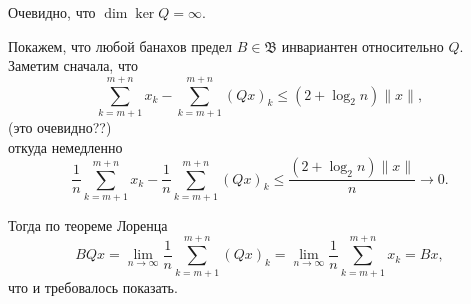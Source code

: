 \documentclass[a4paper,14pt]{article} %
\begin{document}
Очевидно, что $\dim \ker Q = \infty$.

Покажем, что любой банахов предел $B\in\mathfrak{B}$ инвариантен относительно $Q$.
Заметим сначала, что
\begin{equation}
	\sum_{k=m+1}^{m+n} x_k - \sum_{k=m+1}^{m+n} (Qx)_k \leqslant (2 + \log_2 n) \|x\|,
\end{equation}
(это очевидно??)\\
откуда немедленно
\begin{equation}
	\frac{1}{n}\sum_{k=m+1}^{m+n} x_k - \frac{1}{n}\sum_{k=m+1}^{m+n} (Qx)_k \leqslant \frac{(2 + \log_2 n) \|x\|}{n} \to 0.
\end{equation}

Тогда по теореме Лоренца
\begin{equation}
	BQx =
	\lim_{n\to\infty} \frac{1}{n}\sum_{k=m+1}^{m+n} (Qx)_k =
	\lim_{n\to\infty} \frac{1}{n}\sum_{k=m+1}^{m+n} x_k =
	Bx,
\end{equation}
что и требовалось показать.
\end{document}
